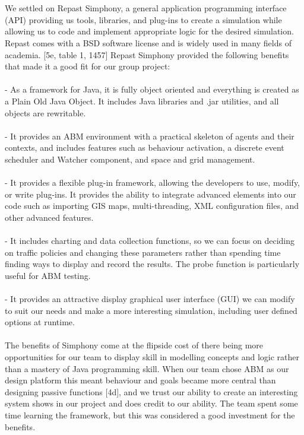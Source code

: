 \documentclass[11pt]{article}
\begin{document}
\\ \\
We settled on Repast Simphony, a general application programming interface (API) providing us tools, libraries, and plug-ins to create a simulation while allowing us to code and implement appropriate logic for the desired simulation. Repast comes with a BSD software license and is widely used in many fields of academia. [5e, table 1, 1457] Repast Simphony provided the following benefits that made it a good fit for our group project:
\\ \\
- As a framework for Java, it is fully object oriented and everything is created as a Plain Old Java Object. It includes Java libraries and .jar utilities, and all objects are rewritable.
\\ \\
- It provides an ABM environment with a practical skeleton of agents and their contexts, and includes features such as behaviour activation, a discrete event scheduler and Watcher component, and space and grid management.
\\ \\
- It provides a flexible plug-in framework, allowing the developers to use, modify, or write plug-ins. It provides the ability to integrate advanced elements into our code such as importing GIS maps, multi-threading, XML configuration files, and other advanced features.
\\ \\
- It includes charting and data collection functions, so we can focus on deciding on traffic policies and changing these parameters rather than spending time finding ways to display and record the results. The probe function is particularly useful for ABM testing.
\\ \\
- It provides an attractive display graphical user interface (GUI) we can modify to suit our needs and make a more interesting simulation, including user defined options at runtime.
\\ \\
The benefits of Simphony come at the flipside cost of there being more opportunities for our team to display skill in modelling concepts and logic rather than a mastery of Java programming skill. When our team chose ABM as our design platform this meant behaviour and goals became more central than designing passive functions [4d], and we trust our ability to create an interesting system shows in our project and does credit to our ability. The team spent some time learning the framework, but this was considered a good investment for the benefits.
\\ \\
\end{document}
